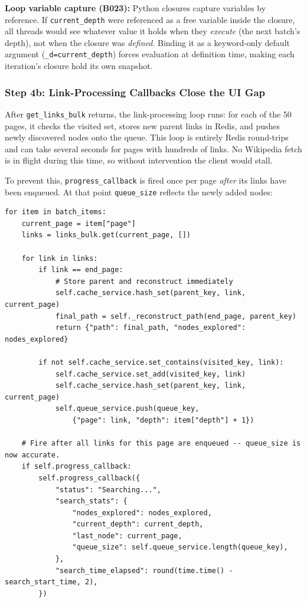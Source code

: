 \documentclass[11pt,a4paper]{article}
\begin{document}
\noindent\textbf{Loop variable capture (B023):} Python closures capture variables by reference. If \texttt{current\_depth} were referenced as a free variable inside the closure, all threads would see whatever value it holds when they \emph{execute} (the next batch's depth), not when the closure was \emph{defined}. Binding it as a keyword-only default argument (\texttt{\_d=current\_depth}) forces evaluation at definition time, making each iteration's closure hold its own snapshot.

\subsubsection{Step 4b: Link-Processing Callbacks Close the UI Gap}

After \texttt{get\_links\_bulk} returns, the link-processing loop runs: for each of the 50 pages, it checks the visited set, stores new parent links in Redis, and pushes newly discovered nodes onto the queue. This loop is entirely Redis round-trips and can take several seconds for pages with hundreds of links. No Wikipedia fetch is in flight during this time, so without intervention the client would stall.

To prevent this, \texttt{progress\_callback} is fired once per page \emph{after} its links have been enqueued. At that point \texttt{queue\_size} reflects the newly added nodes:

\begin{lstlisting}[caption=pathfinding.py -- Per-page callback during link processing]
for item in batch_items:
    current_page = item["page"]
    links = links_bulk.get(current_page, [])

    for link in links:
        if link == end_page:
            # Store parent and reconstruct immediately
            self.cache_service.hash_set(parent_key, link, current_page)
            final_path = self._reconstruct_path(end_page, parent_key)
            return {"path": final_path, "nodes_explored": nodes_explored}

        if not self.cache_service.set_contains(visited_key, link):
            self.cache_service.set_add(visited_key, link)
            self.cache_service.hash_set(parent_key, link, current_page)
            self.queue_service.push(queue_key,
                {"page": link, "depth": item["depth"] + 1})

    # Fire after all links for this page are enqueued -- queue_size is now accurate.
    if self.progress_callback:
        self.progress_callback({
            "status": "Searching...",
            "search_stats": {
                "nodes_explored": nodes_explored,
                "current_depth": current_depth,
                "last_node": current_page,
                "queue_size": self.queue_service.length(queue_key),
            },
            "search_time_elapsed": round(time.time() - search_start_time, 2),
        })
\end{lstlisting}
\end{document}
